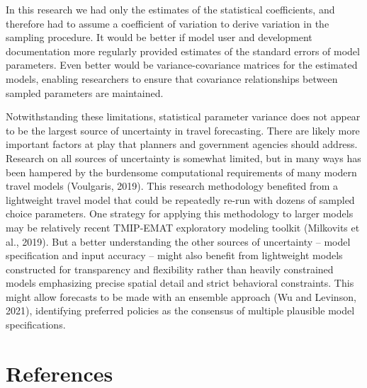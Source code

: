 \documentclass[
  futuretransp,
  submit,
  moreauthors,
]{Definitions/mdpi}
\begin{document}
In this research we had only the estimates of the statistical
coefficients, and therefore had to assume a coefficient of variation to
derive variation in the sampling procedure. It would be better if model
user and development documentation more regularly provided estimates of
the standard errors of model parameters. Even better would be
variance-covariance matrices for the estimated models, enabling
researchers to ensure that covariance relationships between sampled
parameters are maintained.

Notwithstanding these limitations, statistical parameter variance does
not appear to be the largest source of uncertainty in travel
forecasting. There are likely more important factors at play that
planners and government agencies should address. Research on all sources
of uncertainty is somewhat limited, but in many ways has been hampered
by the burdensome computational requirements of many modern travel
models (Voulgaris, 2019). This research methodology benefited from a
lightweight travel model that could be repeatedly re-run with dozens of
sampled choice parameters. One strategy for applying this methodology to
larger models may be relatively recent TMIP-EMAT exploratory modeling
toolkit (Milkovits et al., 2019). But a better understanding the other
sources of uncertainty -- model specification and input accuracy --
might also benefit from lightweight models constructed for transparency
and flexibility rather than heavily constrained models emphasizing
precise spatial detail and strict behavioral constraints. This might
allow forecasts to be made with an ensemble approach (Wu and Levinson,
2021), identifying preferred policies as the consensus of multiple
plausible model specifications.





\section*{References}\label{references}
\end{document}
